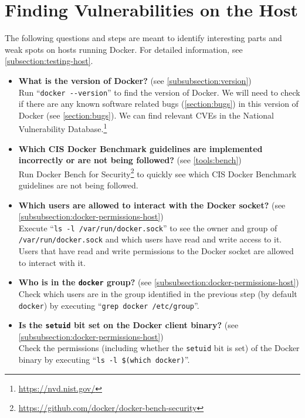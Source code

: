 \section{Finding Vulnerabilities on the Host}\label{section:checklist-vulnerabilities-host}
The following questions and steps are meant to identify interesting parts and weak spots on hosts running Docker. For detailed information, see \autoref{subsection:testing-host}.

\begin{itemize}
    \item \textbf{What is the version of Docker?} (see \autoref{subsubsection:version})\\
        Run ``\lstinline{docker --version}'' to find the version of Docker. We will need to check if there are any known software related bugs (\autoref{section:bugs}) in this version of Docker (see \autoref{section:bugs}). We can find relevant CVEs in the National Vulnerability Database.\footnote{\url{https://nvd.nist.gov/}}

    \item \textbf{Which CIS Docker Benchmark guidelines are implemented incorrectly or are not being followed?} (see \autoref{tools:bench})\\
        Run Docker Bench for Security\footnote{\url{https://github.com/docker/docker-bench-security}} to quickly see which CIS Docker Benchmark guidelines are not being followed.

    \item \textbf{Which users are allowed to interact with the Docker socket?} (see \autoref{subsubsection:docker-permissions-host})\\
    Execute ``\lstinline{ls -l /var/run/docker.sock}'' to see the owner and group of \lstinline{/var/run/docker.sock} and which users have read and write access to it. Users that have read and write permissions to the Docker socket are allowed to interact with it.

    \item \textbf{Who is in the \lstinline{docker} group?} (see \autoref{subsubsection:docker-permissions-host})\\
    Check which users are in the group identified in the previous step (by default \lstinline{docker}) by executing ``\lstinline{grep docker /etc/group}''.

    \item \textbf{Is the \lstinline{setuid} bit set on the Docker client binary?} (see \autoref{subsubsection:docker-permissions-host})\\
    Check the permissions (including whether the \lstinline{setuid} bit is set) of the Docker binary by executing ``\lstinline{ls -l $(which docker)}''.


\end{itemize}
